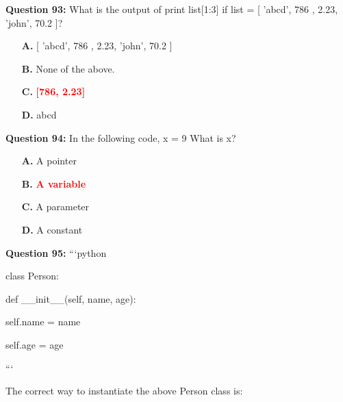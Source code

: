 \documentclass[12pt,a4paper]{article}
\begin{document}
\vspace{0.5cm}

\textbf{Question 93:} What is the output of print list[1:3] if list = [ 'abcd', 786 , 2.23, 'john', 70.2 ]?

\begin{itemize}
    \item[\textbf{A.}] [ 'abcd', 786 , 2.23, 'john', 70.2 ]
    \item[\textbf{B.}] None of the above.
    \item[\textbf{C.}] \textcolor{red}{\textbf{[786, 2.23]}}
    \item[\textbf{D.}] abcd
\end{itemize}

\vspace{0.5cm}

\textbf{Question 94:} In the following code, x = 9 What is x?

\begin{itemize}
    \item[\textbf{A.}] A pointer
    \item[\textbf{B.}] \textcolor{red}{\textbf{A variable}}
    \item[\textbf{C.}] A parameter
    \item[\textbf{D.}] A constant
\end{itemize}

\vspace{0.5cm}

\textbf{Question 95:} ```python\newline

\newline
class Person:\newline

\newline
    def __init__(self, name, age):\newline

\newline
        self.name = name\newline

\newline
        self.age = age\newline

\newline
```\newline

\newline
\newline

\newline
The correct way to instantiate the above Person class is:
\end{document}
